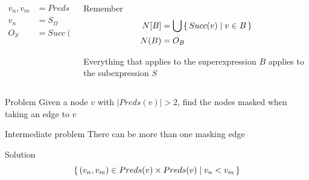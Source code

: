 \documentclass[xcolor = {dvipsnames, table}]{beamer}
\begin{document}
\begin{frame}
    \begin{columns}
        \begin{column}{0.5\textwidth}
            \begin{align*}
                { v_n, v_m } &= Preds(v) \\
                v_n &= S_\Omega \\
                O_S &=  Succ(v_n) \\
            \end{align*}
        \end{column}

        \begin{column}{0.5\textwidth}
            \begin{block}{Remember}
                \begin{align*}
                    N[B] &= \bigcup \set{Succ(v) \mid v \in B} \\
                    N(B) &= O_B \\
                \end{align*}
            \end{block}

            Everything that applies to the superexpression $B$ applies to the
            subexpression $S$
        \end{column}
    \end{columns}
\end{frame}

\begin{frame}
    \begin{block}{Problem}
        Given a node $v$ with $|Preds(v)| > 2$, find the nodes masked when
        taking an edge to $v$
    \end{block}

    \begin{block}{Intermediate problem}
        There can be more than one masking edge
    \end{block}

    \begin{block}{Solution}
        \begin{equation*}
            \set{(v_n, v_m) \in Preds(v) \times Preds(v) \mid v_n < v_m}
        \end{equation*}
    \end{block}
\end{frame}
\end{document}
